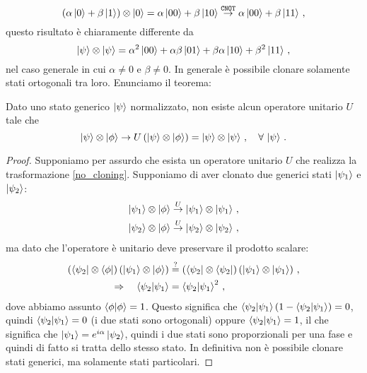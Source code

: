 \begin{equation*}
    \left( \alpha \ket{0} + \beta \ket{1} \right) \otimes \ket{0} = \alpha \ket{00} + \beta \ket{10} \overset{\texttt{CNOT}}{\rightarrow} \alpha \ket{00} + \beta \ket{11} \, ,
\end{equation*}
questo risultato è chiaramente differente da 
\begin{equation*}
    \ket{\psi} \otimes \ket{\psi} = \alpha^2 \ket{00} + \alpha \beta \ket{01} + \beta \alpha \ket{10} + \beta^2 \ket{11} \, ,
\end{equation*}
nel caso generale in cui $\alpha \neq 0$ e $\beta \neq 0$. In generale è possibile clonare solamente stati ortogonali tra loro. Enunciamo il teorema:

\begin{teorema}
    Dato uno stato generico $\ket{\psi}$ normalizzato, non esiste alcun operatore unitario $U$ tale che
    \begin{equation}\label{no_cloning}
        \ket{\psi} \otimes \ket{\phi} \rightarrow U \left( \ket{\psi} \otimes \ket{\phi} \right) = \ket{\psi} \otimes \ket{\psi} \, , \quad \forall \, \ket{\psi} \, . 
    \end{equation}
\end{teorema}

\begin{proof}
    Supponiamo per assurdo che esista un operatore unitario $U$ che realizza la trasformazione \eqref{no_cloning}. Supponiamo di aver clonato due generici stati $\ket{\psi_1}$ e $\ket{\psi_2}$:
    \begin{align*}
        \ket{\psi_1} \otimes \ket{\phi} &\overset{U}{\rightarrow} \ket{\psi_1} \otimes \ket{\psi_1} \, , \\
        \ket{\psi_2} \otimes \ket{\phi} &\overset{U}{\rightarrow} \ket{\psi_2} \otimes \ket{\psi_2} \, ,
    \end{align*}
    ma dato che l'operatore è unitario deve preservare il prodotto scalare:
    \begin{align*}
        \left( \bra{\psi_2} \otimes \bra{\phi} \right) \left( \ket{\psi_1} \otimes \ket{\phi} \right) &\overset{?}{=} \left( \bra{\psi_2} \otimes \bra{\psi_2} \right) \left( \ket{\psi_1} \otimes \ket{\psi_1} \right) \, , \\
        \Rightarrow \quad \braket{\psi_2}{\psi_1} &= \braket{\psi_2}{\psi_1}^2 \, ,
    \end{align*}
    dove abbiamo assunto $\braket{\phi} = 1$. Questo significa che $\braket{\psi_2}{\psi_1} \left( 1 - \braket{\psi_2}{\psi_1} \right) = 0$, quindi $\braket{\psi_2}{\psi_1} = 0$ (i due stati sono ortogonali) oppure $\braket{\psi_2}{\psi_1} = 1$, il che significa che $\ket{\psi_1} = e^{i \alpha} \ket{\psi_2}$, quindi i due stati sono proporzionali per una fase e quindi di fatto si tratta dello stesso stato. In definitiva non è possibile clonare stati generici, ma solamente stati particolari. 
\end{proof}

